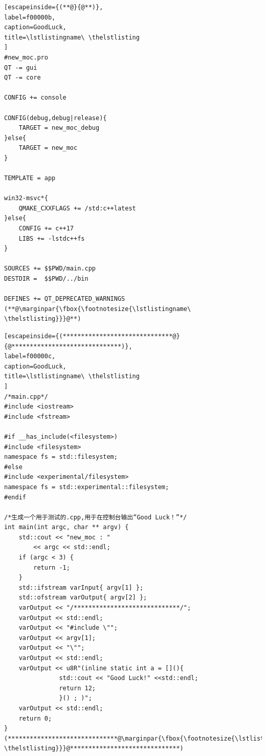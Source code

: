 \FloatBarrier
\begin{lstlisting}[escapeinside={(**@}{@**)},
label=f00000b,
caption=GoodLuck,
title=\lstlistingname\ \thelstlisting
]
#new_moc.pro
QT -= gui
QT -= core

CONFIG += console

CONFIG(debug,debug|release){
    TARGET = new_moc_debug
}else{
    TARGET = new_moc
}

TEMPLATE = app

win32-msvc*{
    QMAKE_CXXFLAGS += /std:c++latest
}else{
    CONFIG += c++17
    LIBS += -lstdc++fs
}

SOURCES += $$PWD/main.cpp
DESTDIR =  $$PWD/../bin

DEFINES += QT_DEPRECATED_WARNINGS
(**@\marginpar{\fbox{\footnotesize{\lstlistingname\ \thelstlisting}}}@**)\end{lstlisting}          %
\FloatBarrier
\begin{lstlisting}[escapeinside={(******************************@}{@******************************)},
label=f00000c,
caption=GoodLuck,
title=\lstlistingname\ \thelstlisting
]
/*main.cpp*/
#include <iostream>
#include <fstream>

#if __has_include(<filesystem>)
#include <filesystem>
namespace fs = std::filesystem;
#else
#include <experimental/filesystem>
namespace fs = std::experimental::filesystem;
#endif

/*生成一个用于测试的.cpp,用于在控制台输出“Good Luck！”*/
int main(int argc, char ** argv) {
    std::cout << "new_moc : "
        << argc << std::endl;
    if (argc < 3) {
        return -1;
    }
    std::ifstream varInput{ argv[1] };
    std::ofstream varOutput{ argv[2] };
    varOutput << "/*****************************/";
    varOutput << std::endl;
    varOutput << "#include \"";
    varOutput << argv[1];
    varOutput << "\"";
    varOutput << std::endl;
    varOutput << u8R"(inline static int a = [](){
               std::cout << "Good Luck!" <<std::endl;
               return 12;
               }() ; )";
    varOutput << std::endl;
    return 0;
}
(******************************@\marginpar{\fbox{\footnotesize{\lstlistingname\ \thelstlisting}}}@******************************)\end{lstlisting}          %

